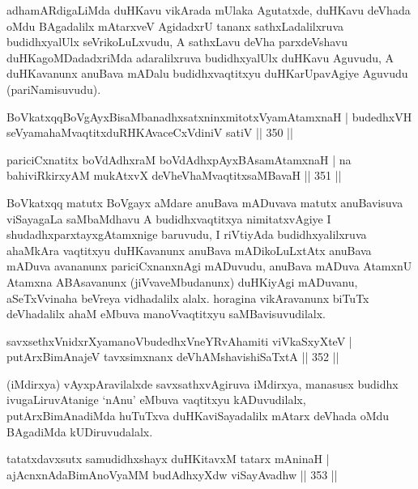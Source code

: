 \begin{artha}
adhamARdigaLiMda duHKavu vikArada mUlaka Agutatxde, duHKavu deVhada oMdu BAgadalilx mAtarxveV AgidadxrU tananx sathxLadalilxruva budidhxyalUlx seVrikoLuLxvudu, A sathxLavu deVha parxdeVshavu duHKagoMDadadxriMda adaralilxruva budidhxyalUlx duHKavu Aguvudu, A duHKavanunx anuBava mADalu budidhxvaqtitxyu duHKarUpavAgiye Aguvudu (pariNamisuvudu).
\end{artha}


\begin{shl}
BoVkatxqqBoVgAyxBisaMbanadhxsatxninxmitotxV\s yamAtamxnaH |
budedhxVH seVyamahaMvaqtitxduRHKAvaceCxVdiniV satiV \hfill || 350 ||
\end{shl}

\begin{shl}
pariciCxnatitx boVdAdhxraM boVdAdhx\s pAyxBAsamAtamxnaH |
na bahiviRkirxyAM mukAtxvX deVheV\s haMvaqtitxsaMBavaH \hfill || 351 ||
\end{shl}

\begin{artha}
BoVkatxqq matutx BoVgayx aMdare anuBava mADuvava matutx anuBavisuva viSayagaLa saMbaMdhavu A budidhxvaqtitxya nimitatxvAgiye I shudadhxparxtayxgAtamxnige baruvudu, I riVtiyAda budidhxyalilxruva ahaMkAra vaqtitxyu duHKavanunx anuBava mADikoLuLxtAtx anuBava mADuva avananunx pariciCxnanxnAgi mADuvudu, anuBava mADuva AtamxnU Atamxna ABAsavanunx (jiVvaveMbudanunx) duHKiyAgi mADuvanu, aSeTxVvinaha beVreya vidhadalilx alalx. horagina vikAravanunx biTuTx deVhadalilx ahaM eMbuva manoVvaqtitxyu saMBavisuvudilalx.
\end{artha}


\begin{shl}
savxsethxVnidxrXyamanoVbudedhxVneYRvAhamiti viVkaSxyXteV |
putArxBimAnajeV tavxsimxnanx deVhAMshavishiSaTxtA \hfill || 352 ||
\end{shl}

\begin{artha}
(iMdirxya) vAyxpAravilalxde savxsathxvAgiruva iMdirxya, manasusx budidhx ivugaLiruvAtanige `nAnu' eMbuva vaqtitxyu kADuvudilalx, putArxBimAnadiMda huTuTxva duHKaviSayadalilx mAtarx deVhada oMdu BAgadiMda kUDiruvudalalx.
\end{artha}


\begin{shl}
tatatxdavxsutx samudidhxshayx duHKitavxM tatarx mAninaH |
ajAcnxnAdaBimAnoV\s yaMM budAdhxyXdw viSayAvadhw \hfill || 353 ||
\end{shl}

